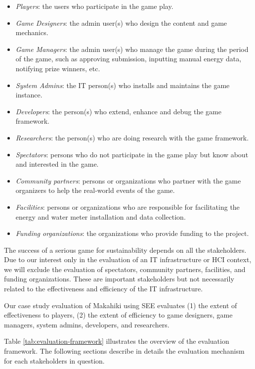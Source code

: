 \documentclass{sigchi}
\begin{document}
\begin{itemize}
\item \emph{Players}: the users who participate in the game play.
\item \emph{Game Designers}: the admin user(s) who design the content
  and game mechanics.
 \item \emph{Game Managers}: the admin user(s) who manage the game
   during the period of the game, such as approving submission,
   inputting manual energy data, notifying prize winners, etc.
\item \emph{System Admins}: the IT person(s) who installs and maintains
  the game instance.
\item \emph{Developers}: the person(s) who extend, enhance and debug
  the game framework.
\item \emph{Researchers}: the person(s) who are doing research with
  the game framework.
\item \emph{Spectators}: persons who do not participate in the game
  play but know about and interested in the game.
\item \emph{Community partners}: persons or organizations who partner
  with the game organizers to help the real-world events of the game.
\item \emph{Facilities}: persons or organizations who are responsible
  for facilitating the energy and water meter installation and data
  collection.
\item \emph{Funding organizations}: the organizations who provide
  funding to the project.
\end{itemize}

The success of a serious game for sustainability depends on all the
stakeholders. Due to our interest only in the evaluation of an IT
infrastructure or HCI context, we will exclude the evaluation of
spectators, community partners, facilities, and funding organizations.
These are important stakeholders but not necessarily related to the
effectiveness and efficiency of the IT infrastructure.

Our case study evaluation of Makahiki using SEE evaluates (1) the
extent of effectiveness to players, (2) the extent of efficiency to
game designers, game managers, system admins, developers, and
researchers.

Table \ref{tab:evaluation-framework} illustrates the overview of the
evaluation framework. The following sections describe in details the
evaluation mechanism for each stakeholders in question.
\end{document}
